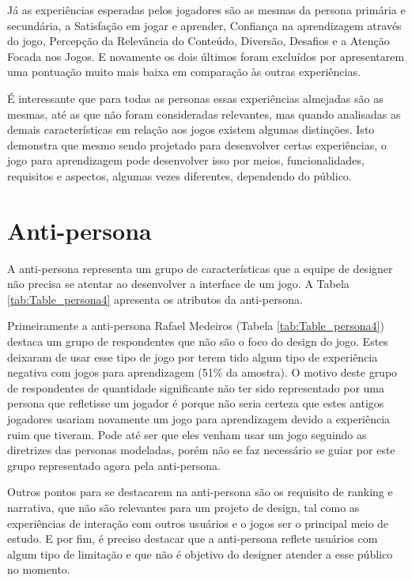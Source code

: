 Já as experiências esperadas pelos jogadores são as mesmas da persona primária e secundária, a Satisfação em jogar e aprender, Confiança na aprendizagem através do jogo, Percepção da Relevância do Conteúdo, Diversão, Desafios e a Atenção Focada nos Jogos. E novamente os dois últimos foram excluídos por apresentarem uma pontuação muito mais baixa em comparação às outras experiências. 

É interessante que para todas as personas essas experiências almejadas são as mesmas, até as que não foram consideradas relevantes, mas quando analisadas as demais características em relação aos jogos existem algumas distinções. Isto demonstra que mesmo sendo projetado para desenvolver certas experiências, o jogo para aprendizagem pode desenvolver isso por meios, funcionalidades, requisitos e aspectos, algumas vezes diferentes, dependendo do público.


\section{Anti-persona}
\label{sec:p4}

A anti-persona representa um grupo de características que a equipe de designer não precisa se atentar ao desenvolver a interface de um jogo. A Tabela \ref{tab:Table_persona4} apresenta os atributos da anti-persona.



Primeiramente a anti-persona Rafael Medeiros (Tabela \ref{tab:Table_persona4}) destaca um grupo de respondentes que não são o foco do design do jogo. Estes deixaram de usar esse tipo de jogo por terem tido algum tipo de experiência negativa com jogos para aprendizagem (51\% da amostra). O motivo deste grupo de respondentes de quantidade significante não ter sido representado por uma persona que refletisse um jogador é porque não seria certeza que estes antigos jogadores usariam novamente um jogo para aprendizagem devido a experiência ruim que tiveram. Pode até ser que eles venham usar um jogo seguindo as diretrizes das personas modeladas, porém não se faz necessário se guiar por este grupo representado agora pela anti-persona.

Outros pontos para se destacarem na anti-persona são os requisito de ranking e narrativa, que não são relevantes para um projeto de design, tal como as experiências de interação com outros usuários e o jogos ser o principal meio de estudo. E por fim, é preciso destacar que a anti-persona reflete usuários com algum tipo de limitação e que não é objetivo do designer atender a esse público no momento. 

